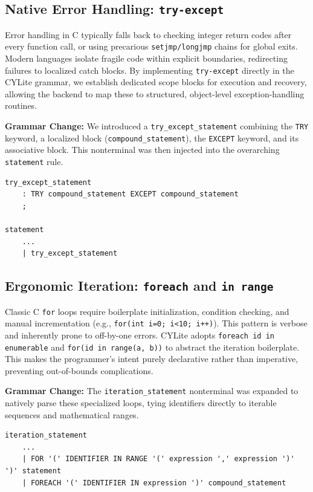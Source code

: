 \documentclass[a4paper,12pt]{article}
\begin{document}
\subsection{Native Error Handling: \texttt{try-except}}
Error handling in C typically falls back to checking integer return codes after every function call, or using precarious \texttt{setjmp/longjmp} chains for global exits. Modern languages isolate fragile code within explicit boundaries, redirecting failures to localized catch blocks. By implementing \texttt{try-except} directly in the CYLite grammar, we establish dedicated scope blocks for execution and recovery, allowing the backend to map these to structured, object-level exception-handling routines.

\textbf{Grammar Change:} We introduced a \texttt{try\_except\_statement} combining the \texttt{TRY} keyword, a localized block (\texttt{compound\_statement}), the \texttt{EXCEPT} keyword, and its associative block. This nonterminal was then injected into the overarching \texttt{statement} rule.

\begin{lstlisting}
try_except_statement
    : TRY compound_statement EXCEPT compound_statement
    ;

statement
    ...
    | try_except_statement
\end{lstlisting}

\subsection{Ergonomic Iteration: \texttt{foreach} and \texttt{in range}}

Classic C \texttt{for} loops require boilerplate initialization, condition checking, and manual incrementation (e.g., \texttt{for(int i=0; i<10; i++)}). This pattern is verbose and inherently prone to off-by-one errors. CYLite adopts \texttt{foreach id in enumerable} and \texttt{for(id in range(a, b))} to abstract the iteration boilerplate. This makes the programmer's intent purely declarative rather than imperative, preventing out-of-bounds complications.

\textbf{Grammar Change:} The \texttt{iteration\_statement} nonterminal was expanded to natively parse these specialized loops, tying identifiers directly to iterable sequences and mathematical ranges.

\begin{lstlisting}
iteration_statement
    ...
    | FOR '(' IDENTIFIER IN RANGE '(' expression ',' expression ')' ')' statement
    | FOREACH '(' IDENTIFIER IN expression ')' compound_statement
\end{lstlisting}
\end{document}

